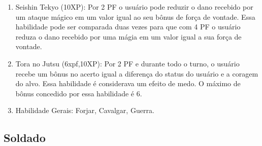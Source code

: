 \begin{enumerate}
	\item Seishin Tekyo (10XP): Por 2 PF o usuário pode reduzir o dano recebido por um ataque mágico em um valor igual ao seu bônus de força de vontade. Essa habilidade pode ser comparada duas vezes para que com 4 PF o usuário reduza o dano recebido por uma mágia em um valor igual a sua força de vontade.
	
	\item Tora no Jutsu (6xpf,10XP): Por 2 PF e durante todo o turno, o usuário recebe um bônus no acerto igual a diferença do status do usuário e a coragem do alvo. Essa habilidade é considerava um efeito de medo. O máximo de bônus concedido por essa habilidade é 6.
			
	\item Habilidade Gerais: Forjar, Cavalgar, Guerra.
	
\end{enumerate}

\subsection{Soldado} 

